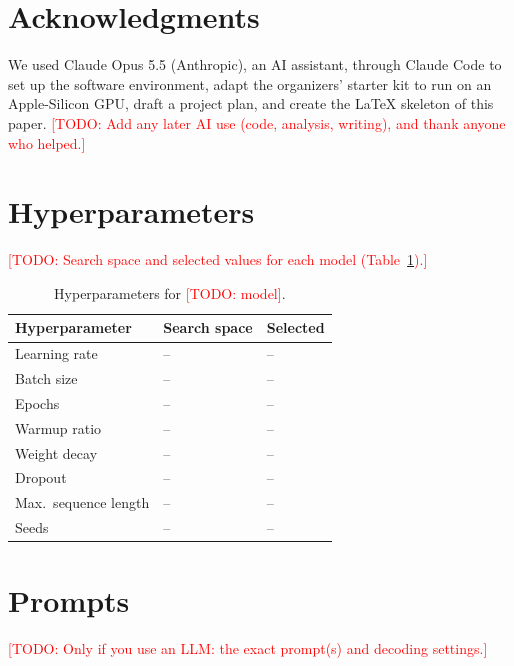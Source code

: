 \documentclass[11pt]{article}
\newcommand{\todo}[1]{\textcolor{red}{[TODO: #1]}}
\begin{document}
\section*{Acknowledgments}
We used Claude Opus 5.5 (Anthropic), an AI assistant, through Claude Code to set up the software environment, adapt the organizers' starter kit to run on an Apple-Silicon GPU, draft a project plan, and create the \LaTeX{} skeleton of this paper.
\todo{Add any later AI use (code, analysis, writing), and thank anyone who helped.}



\appendix

\section{Hyperparameters}
\label{app:hyperparams}

\todo{Search space and selected values for each model (Table~\ref{tab:hyperparams}).}

\begin{table}[h]
  \centering
  \small
  \begin{tabular}{@{}lll@{}}
    \toprule
    \textbf{Hyperparameter} & \textbf{Search space} & \textbf{Selected} \\
    \midrule
    Learning rate          & -- & -- \\
    Batch size             & -- & -- \\
    Epochs                 & -- & -- \\
    Warmup ratio           & -- & -- \\
    Weight decay           & -- & -- \\
    Dropout                & -- & -- \\
    Max.\ sequence length  & -- & -- \\
    Seeds                  & -- & -- \\
    \bottomrule
  \end{tabular}
  \caption{Hyperparameters for \todo{model}.}
  \label{tab:hyperparams}
\end{table}

\section{Prompts}
\label{app:prompts}

\todo{Only if you use an LLM: the exact prompt(s) and decoding settings.}
\end{document}
